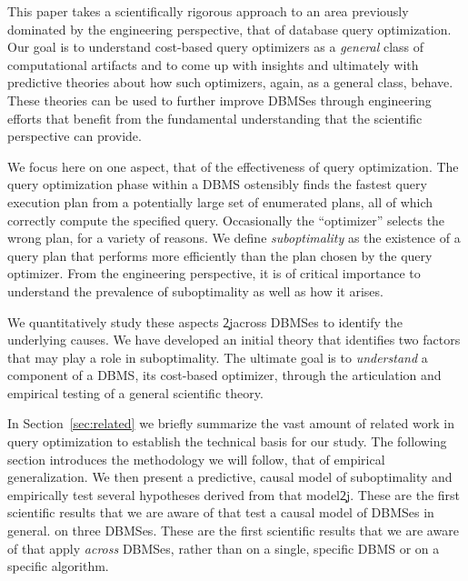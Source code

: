 This paper takes a scientifically rigorous approach to an
area previously dominated by the engineering perspective, that of database
query optimization.  Our goal is to understand cost-based query optimizers
as a {\em general} class of computational artifacts and to come up with
insights and ultimately with predictive theories about how such optimizers,
again, as a general class, behave.  These theories can be used to further
improve DBMSes through engineering efforts that benefit from the fundamental
understanding that the scientific perspective can provide.

We focus here on one aspect, that of the effectiveness of query
optimization. The query optimization phase within a DBMS ostensibly finds the fastest
query execution plan from a potentially large set of enumerated plans, all of
which correctly compute the specified query. Occasionally the ``optimizer''
selects the wrong plan, for a variety of reasons. We define {\em
  suboptimality} as the existence of a query plan that performs more
efficiently than the plan chosen by the query optimizer. From the engineering
perspective, it is of critical importance to understand the prevalence
of suboptimality as well as how it arises.

We quantitatively study these aspects \c2j{}{across DBMSes }to identify the
underlying causes. We have developed an initial theory that identifies two
factors that may play a role in suboptimality. The ultimate goal is to {\em
  understand} a component of a DBMS, its cost-based optimizer, through the
articulation and empirical testing of a general scientific theory.

In Section~\ref{sec:related} we briefly summarize the vast amount of related
work in query optimization to establish the technical basis for our study.
The following section introduces the methodology we will follow, that of
empirical generalization. We then present a predictive, causal model of
suboptimality and empirically test several hypotheses derived from that
model\c2j{. These are the first scientific results that we are aware of that
  test a causal model of DBMSes in general.}{ on three DBMSes.
  These are the first scientific results that we are aware of that apply
  {\em across} DBMSes, rather than on a single, specific DBMS or on a
  specific algorithm.}
